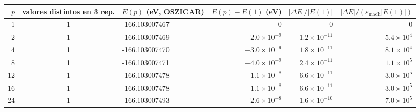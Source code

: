 \begin{tabular}{r c l r r r}
\toprule
$p$ & valores distintos en 3 rep. & $E(p)$ (eV, OSZICAR) & $E(p)-E(1)$ (eV) & $|\Delta E|/|E(1)|$ & $|\Delta E|/(\varepsilon_\mathrm{mach}|E(1)|)$ \\
\midrule
1 & 1 & -166.103007467 & 0 & 0 & 0 \\
2 & 1 & -166.103007469 & $-2.0\times10^{-9}$ & $1.2\times10^{-11}$ & $5.4\times10^{4}$ \\
4 & 1 & -166.103007470 & $-3.0\times10^{-9}$ & $1.8\times10^{-11}$ & $8.1\times10^{4}$ \\
8 & 1 & -166.103007471 & $-4.0\times10^{-9}$ & $2.4\times10^{-11}$ & $1.1\times10^{5}$ \\
12 & 1 & -166.103007478 & $-1.1\times10^{-8}$ & $6.6\times10^{-11}$ & $3.0\times10^{5}$ \\
16 & 1 & -166.103007478 & $-1.1\times10^{-8}$ & $6.6\times10^{-11}$ & $3.0\times10^{5}$ \\
24 & 1 & -166.103007493 & $-2.6\times10^{-8}$ & $1.6\times10^{-10}$ & $7.0\times10^{5}$ \\
\bottomrule
\end{tabular}
